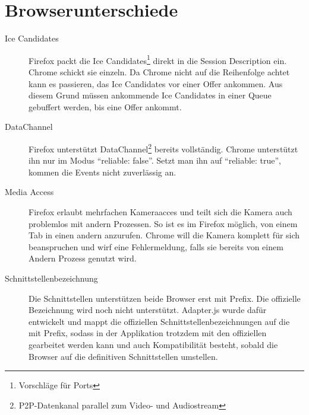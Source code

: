 	\section{Browserunterschiede}
		\begin{description}
			\item[Ice Candidates] Firefox packt die Ice Candidates\footnote{Vorschläge für Ports} direkt in die Session Description ein. Chrome schickt sie einzeln. Da Chrome nicht auf die Reihenfolge achtet kann es passieren, das Ice Candidates vor einer Offer ankommen. Aus diesem Grund müssen ankommende Ice Candidates in einer Queue gebuffert werden, bis eine Offer ankommt.
		
			\item[DataChannel] Firefox unterstützt DataChannel\footnote{P2P-Datenkanal parallel zum Video-
			und Audiostream} bereits vollständig. Chrome unterstützt ihn nur im Modus
			"`reliable: false"'. Setzt man ihn auf "`reliable: true"', kommen die Events
			nicht zuverlässig an.
			
			\item[Media Access] Firefox erlaubt mehrfachen Kameraacces und teilt sich die Kamera auch problemlos mit andern Prozessen. So ist es im Firefox möglich, von einem Tab in einen andern anzurufen. Chrome will die Kamera komplett für sich beanspruchen und wirf eine Fehlermeldung, falls sie bereits von einem Andern Prozess genutzt wird.
			
			\item[Schnittstellenbezeichnung] Die Schnittstellen unterstützen beide Browser erst mit Prefix. Die offizielle Bezeichnung wird noch nicht unterstützt. Adapter.js wurde dafür entwickelt und mappt die offiziellen Schnittstellenbezeichnungen auf die mit Prefix, sodass in der Applikation trotzdem mit den offiziellen gearbeitet werden kann und auch Kompatibilität besteht, sobald die Browser auf die definitiven Schnittstellen umstellen.
	 	\end{description}